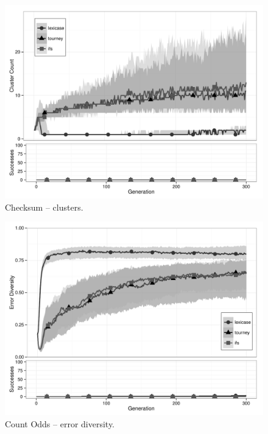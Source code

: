 \begin{figure}[p] %
\centering
\includegraphics[width=11.5cm]{checksum-cluster.pdf}
\caption{Checksum -- clusters.}
\label{checksumClu}
\end{figure}

\begin{figure}[p] %
\centering
\includegraphics[width=11.5cm]{count-odds-diversity.pdf}
\caption{Count Odds -- error diversity.}
\label{count-oddsDiv}
\end{figure}

